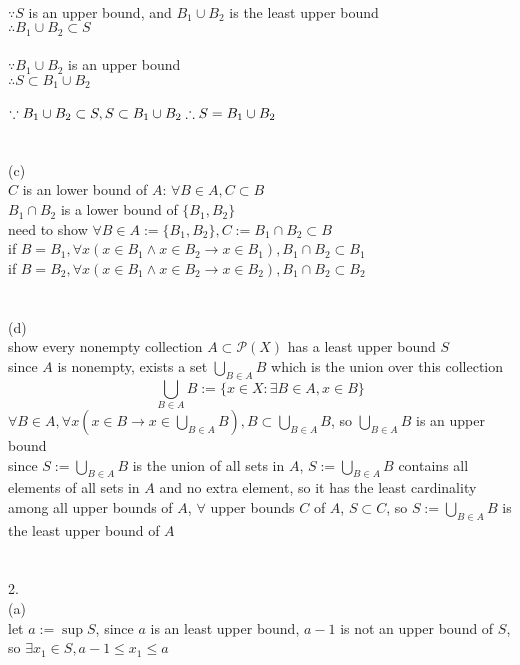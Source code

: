 \documentclass[12pt, border = 4pt, multi]{article} %
\begin{document}
\\
$\because S$ is an upper bound, and $B_1 \cup B_2$ is the least upper bound\\
$\therefore B_1 \cup B_2 \subset S$\\
\\
$\because B_1 \cup B_2$ is an upper bound\\
$\therefore S \subset B_1 \cup B_2$\\
\\
$\because B_1 \cup B_2 \subset S, S \subset B_1 \cup B_2\\
\therefore S = B_1 \cup B_2$\\
\\
\\
(c)\\
$C$ is an lower bound of $A$: $\forall B \in A, C \subset B$\\
$B_1 \cap B_2$ is a lower bound of $\{B_1, B_2\}$\\
need to show $\forall B \in A := \{B_1, B_2\}, C :=  B_1 \cap B_2 \subset B$\\
if $B = B_1, \forall x (x \in B_1 \wedge x \in B_2 \rightarrow x \in B_1), B_1 \cap B_2 \subset B_1$\\
if $B = B_2, \forall x (x \in B_1 \wedge x \in B_2 \rightarrow x \in B_2), B_1 \cap B_2 \subset B_2$\\
\\
\\
(d)\\
show every nonempty collection $A \subset \mathcal{P}(X)$ has a least upper bound $S$\\
since $A$ is nonempty, exists a set $\bigcup_{B \in A} B$ which is the union over this collection
\[\bigcup_{B \in A} B := \{x \in X: \exists B \in A, x \in B\}\]
$\forall B \in A, \forall x(x \in B \rightarrow x \in \bigcup_{B \in A} B), B \subset \bigcup_{B \in A} B$, so $\bigcup_{B \in A} B$ is an upper bound\\
since $S := \bigcup_{B \in A} B$ is the union of all sets in $A$, $S := \bigcup_{B \in A} B$ contains all elements of all sets in $A$ and no extra element, so it has the least cardinality among all upper bounds of $A$, $\forall$ upper bounds $C$ of $A$, $S \subset C$, so $S := \bigcup_{B \in A} B$ is the least upper bound of $A$\\
\\
\\
2.\\
(a)\\
let $a := \sup S$, since $a$ is an least upper bound, $a - 1$ is not an upper bound of $S$, so $\exists x_1 \in S, a - 1 \leq x_1 \leq a$\\
\end{document}
